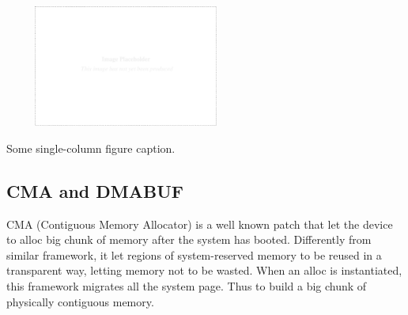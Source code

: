 \documentclass[a4paper,10pt]{article}
\makeatletter
\newenvironment{figurehere}{\def\@captype{figure}\vspace{2ex}}{\vspace{2ex}}
\makeatother
\begin{document}
\begin{multicols}{2}
\begin{table}
\end{table}


%


\begin{figurehere}
 \centering
 \includegraphics[width=8cm, height=4cm]{./eps/placeholder.eps}
 \caption{Some single-column figure caption.}
 \label{fig:myfigure1}
\end{figurehere}


\subsection{CMA and DMABUF}

CMA (Contiguous Memory Allocator) is a well known patch that let the device to alloc 
big chunk of memory after the system has booted.
Differently from similar framework, it let regions of system-reserved memory to 
be reused in a transparent way, letting memory not to be wasted.
When an alloc is instantiated, this framework migrates all the system page. Thus to build a
big chunk of physically contiguous memory.\\


\end{multicols}
\end{document}
